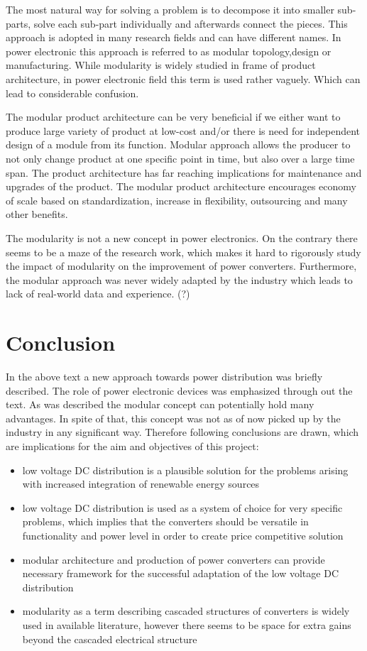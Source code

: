 \documentclass[]{scrreprt}
\begin{document}
The most natural way for solving a problem is to decompose it into smaller sub-parts, solve each sub-part individually and afterwards connect the pieces. %
This approach is adopted in many research fields and can have different names. In power electronic this approach is referred to as modular topology,design or manufacturing. While modularity is widely studied in frame of product architecture, in power electronic field this term is used rather vaguely. Which can lead to considerable confusion.

The modular product architecture can be very beneficial if we either want to produce large variety of product at low-cost and/or there is need for independent design of a module from its function. Modular approach allows the producer to not only change product at one specific point in time, but also over a large time span. The product architecture  has far reaching implications  for maintenance and upgrades of the product. The modular product architecture encourages economy of scale based on standardization, increase in flexibility, outsourcing and many other benefits.


The modularity is not a new concept in power electronics. On the contrary there seems to be a maze of the research work, which makes it hard to rigorously study the impact of modularity on the improvement of power converters. Furthermore, the modular approach was never widely adapted by the industry which leads to lack of real-world data and experience. (?)


\section{Conclusion}

In the above text a new approach towards power distribution was briefly described. The role of power electronic devices was emphasized through out the text. As was described the modular concept can potentially hold many advantages. In spite of that, this concept was not as of now picked up by the industry in any significant way. Therefore following conclusions are drawn, which are implications for the aim and objectives of this project:
\begin{itemize}
	\item low voltage DC distribution is a plausible solution for the problems arising with increased integration of renewable energy sources
	\item low voltage DC distribution is used as a system of choice for very specific problems, which implies that the converters should be versatile in functionality and power level in order to create price competitive solution
	\item modular architecture and production of power converters can provide necessary framework for the successful adaptation of the low voltage DC  distribution
	\item modularity as a term describing cascaded structures of converters is widely used in available literature, however there seems to be space for extra gains beyond the cascaded electrical structure
\end{itemize}
\end{document}
